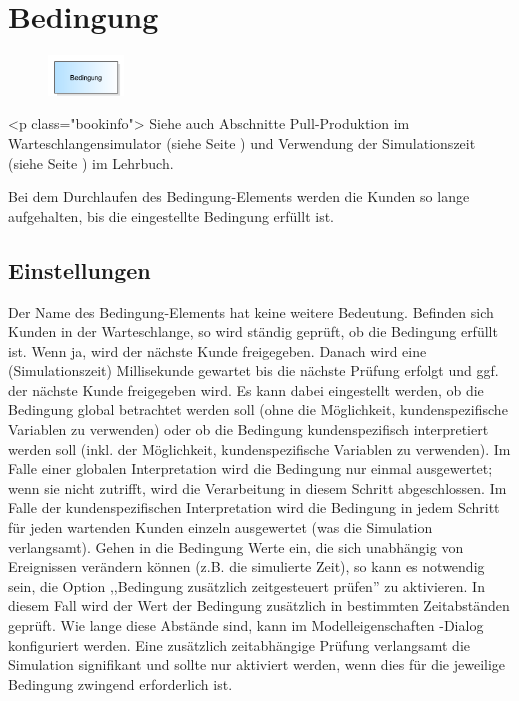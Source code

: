\section{Bedingung}
\label{ref:ModelElementHold}

\begin{figure}
\vspace{-22pt}
\includegraphics[width=2cm]{imageModelElementHold.png}
\vspace{-22pt}
\end{figure}

<p class="bookinfo">
Siehe auch Abschnitte Pull-Produktion im Warteschlangensimulator (siehe Seite \pageref{ref:book:7.6.3}) 
und Verwendung der Simulationszeit (siehe Seite \pageref{ref:book:8.8.3}) im Lehrbuch.

Bei dem Durchlaufen des Bedingung-Elements werden die Kunden so lange aufgehalten, bis die eingestellte Bedingung erfüllt ist. 

\subsection*{Einstellungen}

Der Name des Bedingung-Elements hat keine weitere Bedeutung. Befinden sich Kunden in der Warteschlange, so wird ständig geprüft,
ob die Bedingung erfüllt ist. Wenn ja, wird der nächste Kunde freigegeben. Danach wird eine (Simulationszeit) Millisekunde gewartet bis die nächste
Prüfung erfolgt und ggf. der nächste Kunde freigegeben wird. Es kann dabei eingestellt werden, ob die Bedingung global betrachtet werden soll
(ohne die Möglichkeit, kundenspezifische Variablen zu verwenden) oder ob die Bedingung kundenspezifisch interpretiert werden soll (inkl. der
Möglichkeit, kundenspezifische Variablen zu verwenden). Im Falle einer globalen Interpretation wird die Bedingung nur einmal ausgewertet; wenn
sie nicht zutrifft, wird die Verarbeitung in diesem Schritt abgeschlossen. Im Falle der kundenspezifischen Interpretation wird die Bedingung
in jedem Schritt für jeden wartenden Kunden einzeln ausgewertet (was die Simulation verlangsamt).
Gehen in die Bedingung Werte ein, die sich unabhängig von Ereignissen verändern können (z.B. die simulierte Zeit), so kann es notwendig sein,
die Option ,,Bedingung zusätzlich zeitgesteuert prüfen'' zu aktivieren. In diesem Fall wird der Wert der Bedingung zusätzlich in bestimmten
Zeitabständen geprüft. Wie lange diese Abstände sind, kann im Modelleigenschaften -Dialog konfiguriert
werden. Eine zusätzlich zeitabhängige Prüfung verlangsamt die Simulation signifikant und sollte nur aktiviert werden, wenn dies für die
jeweilige Bedingung zwingend erforderlich ist. 


